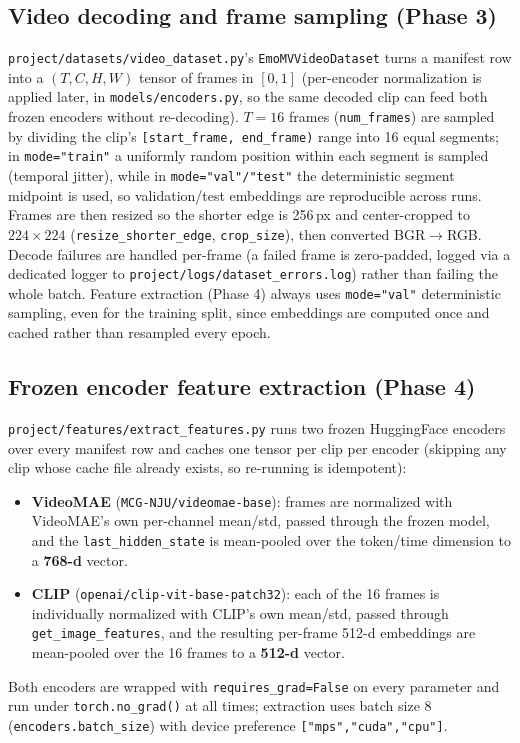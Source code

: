\documentclass[11pt]{article}
\begin{document}
\subsection{Video decoding and frame sampling (Phase 3)}
\texttt{project/datasets/video\_dataset.py}'s \texttt{EmoMVVideoDataset} turns a manifest row into
a $(T,C,H,W)$ tensor of frames in $[0,1]$ (per-encoder normalization is applied later, in
\texttt{models/encoders.py}, so the same decoded clip can feed both frozen encoders without
re-decoding). $T=16$ frames (\texttt{num\_frames}) are sampled by dividing the clip's
\texttt{[start\_frame, end\_frame)} range into 16 equal segments; in \texttt{mode="train"} a
uniformly random position within each segment is sampled (temporal jitter), while in
\texttt{mode="val"/"test"} the deterministic segment midpoint is used, so validation/test
embeddings are reproducible across runs. Frames are then resized so the shorter edge is 256\,px
and center-cropped to $224\times224$ (\texttt{resize\_shorter\_edge}, \texttt{crop\_size}), then
converted BGR$\to$RGB. Decode failures are handled per-frame (a failed frame is zero-padded, logged
via a dedicated logger to \texttt{project/logs/dataset\_errors.log}) rather than failing the whole
batch. Feature extraction (Phase 4) always uses \texttt{mode="val"} deterministic sampling, even
for the training split, since embeddings are computed once and cached rather than resampled every
epoch.

\subsection{Frozen encoder feature extraction (Phase 4)}
\texttt{project/features/extract\_features.py} runs two frozen HuggingFace encoders over every
manifest row and caches one tensor per clip per encoder (skipping any clip whose cache file
already exists, so re-running is idempotent):
\begin{itemize}
  \item \textbf{VideoMAE} (\texttt{MCG-NJU/videomae-base}): frames are normalized with VideoMAE's
  own per-channel mean/std, passed through the frozen model, and the \texttt{last\_hidden\_state}
  is mean-pooled over the token/time dimension to a \textbf{768-d} vector.
  \item \textbf{CLIP} (\texttt{openai/clip-vit-base-patch32}): each of the 16 frames is
  individually normalized with CLIP's own mean/std, passed through
  \texttt{get\_image\_features}, and the resulting per-frame 512-d embeddings are mean-pooled over
  the 16 frames to a \textbf{512-d} vector.
\end{itemize}
Both encoders are wrapped with \texttt{requires\_grad=False} on every parameter and run under
\texttt{torch.no\_grad()} at all times; extraction uses batch size 8
(\texttt{encoders.batch\_size}) with device preference \texttt{["mps","cuda","cpu"]}.
\end{document}
